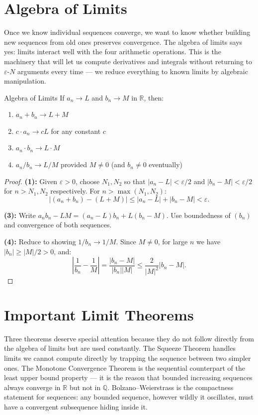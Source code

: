 \documentclass[12pt, openany]{book}
\theoremstyle{plain}
\theoremstyle{definition}
\theoremstyle{remark}
\newcommand{\Q}{\mathbb{Q}}
\newcommand{\R}{\mathbb{R}}
\newcommand{\abs}[1]{\left|#1\right|}
\newcommand{\eps}{\varepsilon}
\begin{document}
\section{Algebra of Limits}

Once we know individual sequences converge, we want to know whether building new sequences from old ones preserves convergence.  The algebra of limits says yes: limits interact well with the four arithmetic operations.  This is the machinery that will let us compute derivatives and integrals without returning to $\varepsilon$-$N$ arguments every time --- we reduce everything to known limits by algebraic manipulation.

\begin{thmbox}{Algebra of Limits}
If $a_n \to L$ and $b_n \to M$ in $\R$, then:
\begin{enumerate}[noitemsep]
  \item $a_n + b_n \to L + M$
  \item $c \cdot a_n \to cL$ for any constant $c$
  \item $a_n \cdot b_n \to L \cdot M$
  \item $a_n / b_n \to L/M$ provided $M \neq 0$ (and $b_n \neq 0$ eventually)
\end{enumerate}
\end{thmbox}
\color{black}

\begin{proof}
\textbf{(1):} Given $\eps > 0$, choose $N_1, N_2$ so that $|a_n - L| < \eps/2$ and $|b_n - M| < \eps/2$ for $n > N_1, N_2$ respectively. For $n > \max(N_1, N_2)$:
\[ |(a_n + b_n) - (L + M)| \leq |a_n - L| + |b_n - M| < \eps. \]

\textbf{(3):} Write $a_n b_n - LM = (a_n - L)b_n + L(b_n - M)$. Use boundedness of $(b_n)$ and convergence of both sequences.

\textbf{(4):} Reduce to showing $1/b_n \to 1/M$. Since $M \neq 0$, for large $n$ we have $|b_n| \geq |M|/2 > 0$, and:
\[ \abs{\frac{1}{b_n} - \frac{1}{M}} = \frac{|b_n - M|}{|b_n||M|} \leq \frac{2}{|M|^2}|b_n - M|. \]
\end{proof}

\section{Important Limit Theorems}

Three theorems deserve special attention because they do not follow directly from the algebra of limits but are used constantly.  The Squeeze Theorem handles limits we cannot compute directly by trapping the sequence between two simpler ones.  The Monotone Convergence Theorem is the sequential counterpart of the least upper bound property --- it is the reason that bounded increasing sequences always converge in $\R$ but not in $\Q$.  Bolzano--Weierstrass is the compactness statement for sequences: any bounded sequence, however wildly it oscillates, must have a convergent subsequence hiding inside it.
\end{document}
